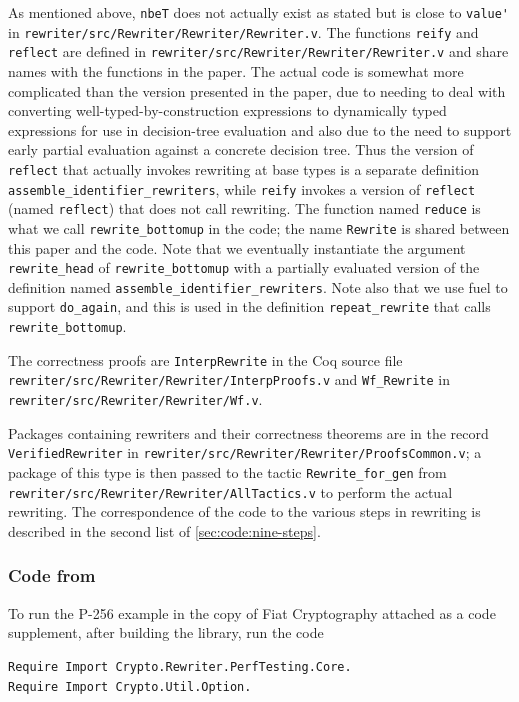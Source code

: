 \begin{subappendices}
As mentioned above, \verb|nbeT| does not actually exist as stated but is close to \verb|value'| in \texttt{rewriter/src/Rewriter/Rewriter/Rewriter.v}.
The functions \verb|reify| and \verb|reflect| are defined in \texttt{rewriter/src/Rewriter/Rewriter/Rewriter.v} and share names with the functions in the paper.
The actual code is somewhat more complicated than the version presented in the paper, due to needing to deal with converting well-typed-by-construction expressions to dynamically typed expressions for use in decision-tree evaluation and also due to the need to support early partial evaluation against a concrete decision tree.
Thus the version of \verb|reflect| that actually invokes rewriting at base types is a separate definition \verb|assemble_identifier_rewriters|, while \verb|reify| invokes a version of \verb|reflect| (named \verb|reflect|) that does not call rewriting.
The function named \texttt{reduce} is what we call \verb|rewrite_bottomup| in the code; the name \verb|Rewrite| is shared between this paper and the code.
Note that we eventually instantiate the argument \verb|rewrite_head| of \verb|rewrite_bottomup| with a partially evaluated version of the definition named \verb|assemble_identifier_rewriters|.
Note also that we use fuel to support \verb|do_again|, and this is used in the definition \verb|repeat_rewrite| that calls \verb|rewrite_bottomup|.

The correctness proofs are \verb|InterpRewrite| in the Coq source file \texttt{rewriter/src/Rewriter/Rewriter/InterpProofs.v} and \verb|Wf_Rewrite| in \texttt{rewriter/src/Rewriter/Rewriter/Wf.v}.

Packages containing rewriters and their correctness theorems are in the record \verb|VerifiedRewriter| in \texttt{rewriter/src/Rewriter/Rewriter/ProofsCommon.v};
a package of this type is then passed to the tactic \verb|Rewrite_for_gen| from \texttt{rewriter/src/Rewriter/Rewriter/AllTactics.v} to perform the actual rewriting.
The correspondence of the code to the various steps in rewriting is described in the second list of \autoref{sec:code:nine-steps}.

\subsubsection{Code from }

To run the P-256 example in the copy of Fiat Cryptography attached as a code supplement, after building the library, run the code
\begin{verbatim}
Require Import Crypto.Rewriter.PerfTesting.Core.
Require Import Crypto.Util.Option.


\end{verbatim}
\end{subappendices}
